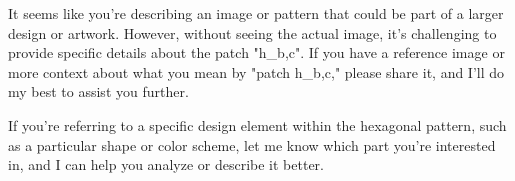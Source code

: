 It seems like you're describing an image or pattern that could be part of a larger design or artwork. However, without seeing the actual image, it's challenging to provide specific details about the patch "h_b,c". If you have a reference image or more context about what you mean by "patch h_b,c," please share it, and I'll do my best to assist you further.

If you're referring to a specific design element within the hexagonal pattern, such as a particular shape or color scheme, let me know which part you're interested in, and I can help you analyze or describe it better.